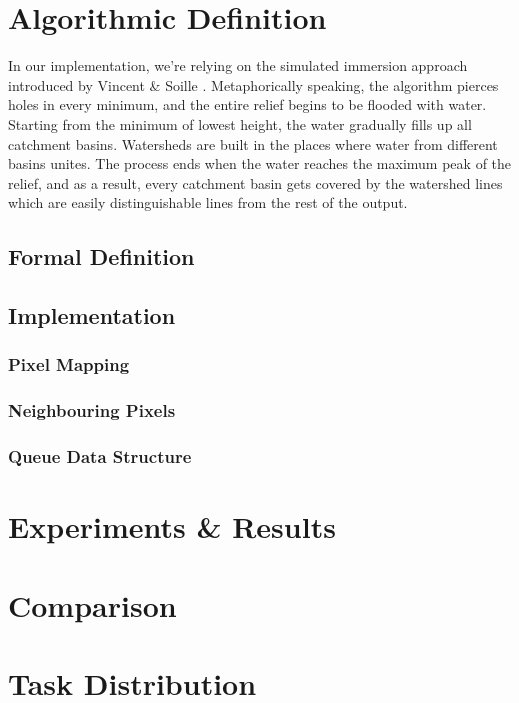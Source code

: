 \documentclass{article}
\begin{document}
\section{Algorithmic Definition}
\vspace{2mm}
In our implementation, we're relying on the simulated immersion approach introduced by Vincent \& Soille \cite{soilletextbook}. \newline\newline
Metaphorically speaking, the algorithm pierces holes in every minimum, and the entire relief begins to be flooded with water. Starting from the minimum of lowest height, the water gradually fills up all catchment basins. Watersheds are built in the places where water from different basins unites. The process ends when the water reaches the maximum peak of the relief, and as a result, every catchment basin gets covered by the watershed lines which are easily distinguishable lines from the rest of the output.
\subsection{Formal Definition}
\subsection{Implementation}
\subsubsection{Pixel Mapping}
\subsubsection{Neighbouring Pixels}
\subsubsection{Queue Data Structure}

\section{Experiments & Results}


\section{Comparison}


\section{Task Distribution}
\end{document}
